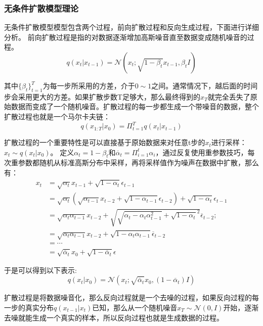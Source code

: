 \subsubsection{无条件扩散模型理论}\label{sec:DDPM}
无条件扩散模型模型包含两个过程，前向扩散过程和反向生成过程，下面进行详细分析。
前向扩散过程是指的对数据逐渐增加高斯噪音直至数据变成随机噪音的过程。
\begin{equation}\label{eqn-11}
      q(x_t|x_{t-1})=\mathcal{N}(x_t;\sqrt{1-\beta_t}x_{t-1},\beta_tI)
\end{equation}
\par
其中$\{\beta_t\}^{T}_{t=1}$为每一步所采用的方差，介于$0 \sim 1$之间。通常情况下，越后面的时间步会采用更大的方差。如果扩散步数T足够大，那么最终得到的$x_T$就完全丢失了原始数据而变成了一个随机噪音。扩散过程的每一步都生成一个带噪音的数据，整个扩散过程也就是一个马尔卡夫链：
\begin{equation}\label{eqn-12}
      q(x_{1:T}|x_0) = \Pi^T_{t=1}{q(x_t|x_{t-1})}
\end{equation}
\par
扩散过程的一个重要特性是可以直接基于原始数据来对任意t步的$x_t$进行采样：$x_t \sim q(x_t|x_0)$。
定义$\alpha_t = 1 - \beta_t$和$\overline{\alpha}_t=\Pi^t_{i=1}{\alpha_i}$，通过反复使用重参数技巧，每次重参数都随机从标准高斯分布中采样，再将采样值作为噪声在数据中扩散，那么有：
\begin{align}
x_t &= \sqrt{\alpha_t}x_{t-1} + \sqrt{1-\alpha_t}\epsilon_{t-1} \nonumber\\
    &= \sqrt{\alpha_t}(\sqrt{\alpha_{t-1}}x_{t-2} + \sqrt{1-\alpha_{t-1}}\epsilon_{t-2}) + \sqrt{1-\alpha_t}\epsilon_{t-1} \nonumber\\
    &= \sqrt{\alpha_t\alpha_{t-1}}x_{t-2} + \sqrt{\sqrt{\alpha_t-\alpha_t\alpha_{t-1}^2}+ \sqrt{1-\alpha_t}^2}\overline{\epsilon}_{t-2}; \nonumber\\
    &= \sqrt{\alpha_t\alpha_{t-1}}x_{t-2} + \sqrt{1-\alpha_t\alpha_{t-1}}\overline{\epsilon}_{t-2} \nonumber\\
    &= \cdots \nonumber\\
    &= \sqrt{\overline{\alpha}_t}x_{0} + \sqrt{1-\overline{\alpha}_t}\epsilon \label{eqn-13}
\end{align}
\par
于是可以得到以下表示:
\begin{equation}\label{eqn-14}
      q(x_t|x_{0})=\mathcal{N}(x_t;\sqrt{\overline{\alpha}_t}x_{0},(1-\overline{\alpha}_t)I)
\end{equation}
\par
扩散过程是将数据噪音化，那么反向过程就是一个去噪的过程，如果反向过程的每一步的真实分布$q(x_{t-1}|x_t)$已知，那么从一个随机噪音$x_T \sim \mathcal{N}(0,I)$开始，逐渐去噪就能生成一个真实的样本，所以反向过程也就是生成数据的过程。
